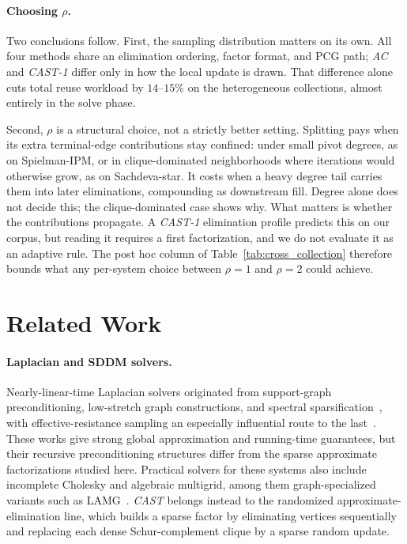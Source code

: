 \documentclass{article}
\newcommand{\CAST}{\textit{CAST}\xspace}
\newcommand{\CASTone}{\textit{CAST-1}\xspace}
\newcommand{\AC}{\textit{AC}\xspace}
\newcommand{\1}{\mathbbm{1}}
\theoremstyle{plain}
\begin{document}
\paragraph{\textbf{Choosing $\rho$}.} Two conclusions follow. First, the sampling distribution matters on its
own. All four methods share an elimination ordering, factor format, and
PCG path; \AC{} and \CASTone{} differ only in how the local update is
drawn. That difference alone cuts total reuse workload by $14$--$15\%$
on the heterogeneous collections, almost entirely in the solve phase.

Second, $\rho$ is a structural choice, not a strictly better setting.
Splitting pays when its extra terminal-edge contributions stay
confined: under small pivot degrees, as on Spielman-IPM, or in
clique-dominated neighborhoods where iterations would otherwise grow,
as on Sachdeva-star. It costs when a heavy degree tail carries them
into later eliminations, compounding as downstream fill. Degree alone
does not decide this; the clique-dominated case shows why. What matters
is whether the contributions propagate. A \CASTone{} elimination
profile predicts this on our corpus, but reading it requires a first
factorization, and we do not evaluate it as an adaptive rule. The
post hoc column of Table~\ref{tab:cross_collection} therefore bounds what
any per-system choice between $\rho=1$ and $\rho=2$ could achieve.



\section{Related Work}
\label{sec:related-work}

\paragraph{Laplacian and SDDM solvers.}
Nearly-linear-time Laplacian solvers originated from support-graph
preconditioning, low-stretch graph constructions, and spectral
sparsification~\cite{spielman2004nearly,koutis2011nearly,
cohen2014solving,jambulapati2021ultrasparse}, with
effective-resistance sampling an especially influential route to the
last~\cite{spielman2008graph}. These works give strong global
approximation and running-time guarantees, but their recursive
preconditioning structures differ from the sparse approximate
factorizations studied here. Practical solvers for these systems also
include incomplete Cholesky and algebraic multigrid, among them
graph-specialized variants such as \textsf{LAMG}~\cite{livne2012lean}.
\CAST{} belongs instead to the randomized approximate-elimination
line, which builds a sparse factor by eliminating vertices
sequentially and replacing each dense Schur-complement clique by a
sparse random update.
\end{document}
